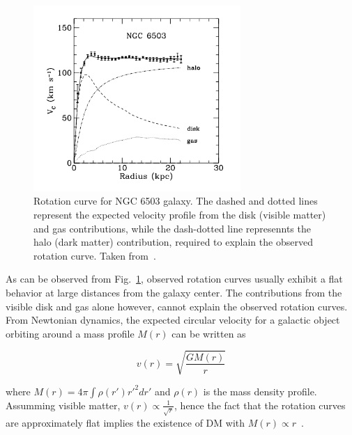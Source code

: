 \begin{figure}[htbp]
    \centering
    \includegraphics[width=0.7\textwidth]{galaxy_rot_curve.png}
    \caption{Rotation curve for NGC 6503 galaxy. The dashed and dotted lines represent the expected velocity profile
    from the disk (visible matter) and gas contributions, while the dash-dotted line represennts the halo (dark matter)
    contribution, required to explain the observed rotation curve. Taken from~\cite{Bertone:2004pz}.}
    \label{fig:galaxy_rot_curve}
\end{figure}

As can be observed from Fig.~\ref{fig:galaxy_rot_curve}, observed rotation curves usually exhibit a flat behavior at
large distances from the galaxy center. The contributions from the visible
disk and gas alone however, cannot explain the observed rotation curves. 
From Newtonian dynamics, the expected circular velocity for a galactic object orbiting around a mass profile $M(r)$ 
can be written as

\begin{equation}
    v(r) = \sqrt{\frac{G M(r)}{r}}
\end{equation}

where $M(r) = 4\pi \int \rho(r') r'^{2} dr'$ and $\rho(r)$ is the mass density profile. Assumming visible matter, $v(r) \propto \frac{1}{\sqrt{r}}$,
hence the fact that the rotation curves are approximately flat implies the existence of DM with $M(r) \propto r$~\cite{Bertone:2004pz}.

